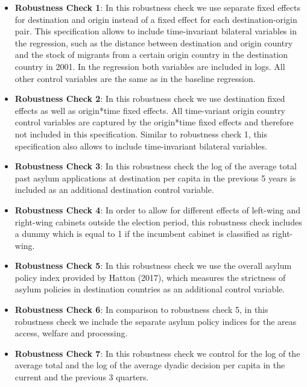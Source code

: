 \documentclass[11pt,a4paper]{scrartcl}
\begin{document}
\begin{itemize}
	\item \textbf{Robustness Check 1}: In this robustness check we use separate fixed effects for destination and origin instead of a fixed effect for each destination-origin pair. This specification allows to include time-invariant bilateral variables in the regression, such as the distance between destination and origin country and the stock of migrants from a certain origin country in the destination country in 2001. In the regression both variables are included in logs. All other control variables are the same as in the baseline regression.  
	
	\item \textbf{Robustness Check 2}: In this robustness check we use destination fixed effects as well as origin*time fixed effects. All time-variant origin country control variables are captured by the origin*time fixed effects and therefore not included in this specification. Similar to robustness check 1, this specification also allows to include time-invariant bilateral variables.  
	
	\item \textbf{Robustness Check 3}: In this robustness check the log of the average total past asylum applications at destination per capita in the previous 5 years is included as an additional destination control variable. 
	
	\item \textbf{Robustness Check 4}: In order to allow for different effects of left-wing and right-wing cabinets outside the election period, this robustness check includes a dummy which is equal to 1 if the incumbent cabinet is classified as right-wing.   
	
	\item \textbf{Robustness Check 5}: In this robustness check we use the overall asylum policy index provided by Hatton (2017), which measures the strictness of asylum policies in destination countries as an additional control variable.
	
	\item \textbf{Robustness Check 6}: In comparison to robustness check 5, in this robustness check we include the separate asylum policy indices for the areas access, welfare and processing. 
	
	\item \textbf{Robustness Check 7}: In this robustness check we control for the log of the average total and the log of the average dyadic decision per capita in the current and the previous 3 quarters.
	

\end{itemize}
\end{document}
